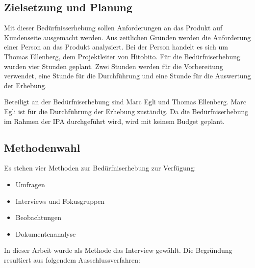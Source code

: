 \subsection{Zielsetzung und Planung}
Mit dieser Bedürfnisserhebung sollen Anforderungen an das Produkt auf Kundenseite ausgemacht werden. Aus zeitlichen Gründen
werden die Anforderung einer Person an das Produkt analysiert. Bei der Person handelt es sich um Thomas Ellenberg, dem Projektleiter von Hitobito.
Für die Bedürfniserhebung wurden vier Stunden geplant. Zwei Stunden werden für die Vorbereitung verwendet, eine Stunde für die Durchführung und
eine Stunde für die Auswertung der Erhebung. 

Beteiligt an der Bedürfniserhebung sind Marc Egli und Thomas Ellenberg. Marc Egli ist für die
Durchführung der Erhebung zuständig. Da die Bedürfniserhebung im Rahmen der IPA durchgeführt wird, wird mit keinem Budget geplant.

\subsection{Methodenwahl}

Es stehen vier Methoden zur Bedürfniserhebung zur Verfügung:

\begin{itemize}
   \item Umfragen
   \item Interviews und Fokusgruppen
   \item Beobachtungen
   \item Dokumentenanalyse
\end{itemize}

\newpage

In dieser Arbeit wurde als Methode das Interview gewählt. Die Begründung resultiert aus folgendem Ausschlussverfahren:

